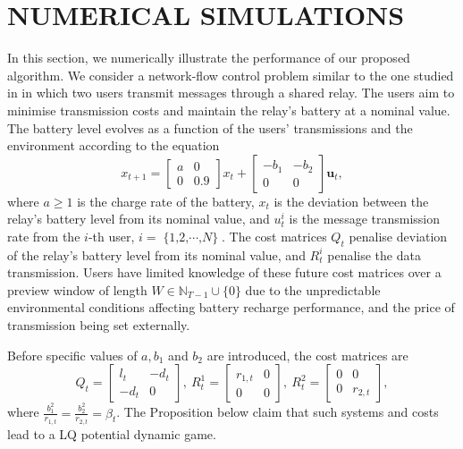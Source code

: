 \documentclass[letterpaper, 10 pt, conference]{ieeeconf}  %
\DeclareMathOperator{\Nplayers}{\{1,2,\cdots,\textit{N}\}}
\begin{document}
\section{NUMERICAL SIMULATIONS}\label{sec:numerical}
In this section, we numerically illustrate the performance of our proposed algorithm. We consider a network-flow control problem similar to the one studied in \cite[Section VI]{zazo_dynamic_2016} in which two users transmit messages through a shared relay.
The users aim to minimise transmission costs and maintain the relay's battery at a nominal value. 
The battery level evolves as a function of the users' transmissions and the environment according to the equation 
\begin{equation}\label{eq:expEquations}
    x_{t+1} = 
    \begin{bmatrix}
        a & 0\\
        0 & 0.9
    \end{bmatrix}
    x_{t} + 
    \begin{bmatrix}
        -b_{1} & -b_{2}\\
        0 & 0
    \end{bmatrix}\mathbf{u}_{t},
\end{equation}
where $a \geq 1$ is the charge rate of the battery, $x_{t}$ is the deviation between the relay's battery level from its nominal value, and $u_{t}^{i}$ is the message transmission rate from the $i$-th user, $i=\Nplayers$.
The cost matrices $Q_{t}$ penalise deviation of the relay's battery level from its nominal value, and $R_{t}^{i}$ penalise the data transmission. 
Users have limited knowledge of these future cost matrices over a preview window of length $W \in \mathbb{N}_{T-1}\cup \{0\}$ due to the unpredictable environmental conditions affecting battery recharge performance, and the price of transmission being set externally.


Before specific values of $a,b_{1}$ and $b_{2}$ are introduced,
the cost matrices are
\begin{equation}\label{eq:costSettings}
    Q_{t} = 
    \begin{bmatrix}
        l_{t} & -d_{t}\\
        -d_{t} & 0
    \end{bmatrix},\
    R_{t}^{1} = 
    \begin{bmatrix}
        r_{1,t} & 0\\
        0 & 0
    \end{bmatrix},\
    R_{t}^{2} = 
    \begin{bmatrix}
        0 & 0\\
        0 & r_{2,t}
    \end{bmatrix},
\end{equation}
where $\frac{b_{1}^{2}}{r_{1,t}}=\frac{b_{2}^{2}}{r_{2,t}} = \beta_{t}$. 
The Proposition below claim that such systems and costs lead to a LQ potential dynamic game.
\end{document}
